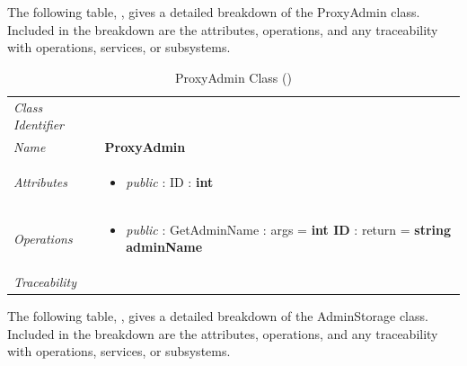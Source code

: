 \documentclass[12pt,letterpaper]{article}
\begin{document}
The following table, , gives a detailed breakdown of the ProxyAdmin class. Included in the breakdown are the attributes, operations, and any traceability with operations, services, or subsystems.

\begin{table}[H]
    \caption{ProxyAdmin Class ()} 
	\begin{tabu} to 
		\toprule
		Class Identifier &  \\
		Name & {\bf ProxyAdmin} \\
		Attributes & 
		\begin{minipage}[t]{\linewidth}
		    \begin{itemize}
		        \item \textit{public} : ID : \bf{int}
			\end{itemize}
	    \end{minipage} \\

		Operations &
		\begin{minipage}[t]{\linewidth}
			\begin{itemize}
			    \item \textit{public} : GetAdminName : args = {\bf int ID} : return = {\bf string adminName}
	        \end{itemize}
	    \end{minipage} \\
	    	Traceability & \\
		\toprule
	\end{tabu}
\end{table}

The following table, , gives a detailed breakdown of the AdminStorage class. Included in the breakdown are the attributes, operations, and any traceability with operations, services, or subsystems.
\end{document}
